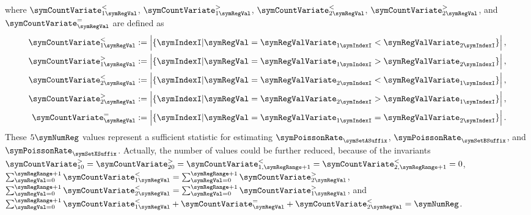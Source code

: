 \documentclass[a4paper]{scrartcl}
\begin{document}
where
$\symCountVariate^{<}_{1\symRegVal}$,
$\symCountVariate^{>}_{1\symRegVal}$,
$\symCountVariate^{<}_{2\symRegVal}$,
$\symCountVariate^{>}_{2\symRegVal}$,
and $\symCountVariate^{=}_{\symRegVal}$ are defined as
\begin{equation}
\label{equ:sufficient_joint_statistic}
\begin{aligned}
\symCountVariate^{<}_{1\symRegVal}&:=\left|\lbrace\symIndexI\vert\symRegVal=\symRegValVariate_{1\symIndexI}<
\symRegValVariate_{2\symIndexI}\rbrace\right|,
\\
\symCountVariate^{>}_{1\symRegVal}&:=\left|\lbrace\symIndexI\vert\symRegVal=\symRegValVariate_{1\symIndexI}>
\symRegValVariate_{2\symIndexI}\rbrace\right|,
\\
\symCountVariate^{<}_{2\symRegVal}&:=\left|\lbrace\symIndexI\vert\symRegVal=\symRegValVariate_{2\symIndexI}<
\symRegValVariate_{1\symIndexI}\rbrace\right|,
\\
\symCountVariate^{>}_{2\symRegVal}&:=\left|\lbrace\symIndexI\vert\symRegVal=\symRegValVariate_{2\symIndexI}>
\symRegValVariate_{1\symIndexI}\rbrace\right|,
\\
\symCountVariate^{=}_{\symRegVal}&:=\left|\lbrace\symIndexI\vert\symRegVal=\symRegValVariate_{1\symIndexI}=
\symRegValVariate_{2\symIndexI}\rbrace\right|.
\end{aligned}
\end{equation}
These $5\symNumReg$ values represent a sufficient statistic for estimating $\symPoissonRate_\symSetASuffix$, $\symPoissonRate_\symSetBSuffix$, and $\symPoissonRate_\symSetXSuffix$. Actually, the number of values could be further reduced, because of the invariants $\symCountVariate^{>}_{10}=\symCountVariate^{>}_{20}=
\symCountVariate^{<}_{1,\symRegRange+1}=\symCountVariate^{<}_{2,\symRegRange+1}=0$, $\sum_{\symRegVal=0}^{\symRegRange+1}{\symCountVariate^{<}_{1\symRegVal}} = \sum_{\symRegVal=0}^{\symRegRange+1}{\symCountVariate^{>}_{2\symRegVal}}$,
$\sum_{\symRegVal=0}^{\symRegRange+1}{\symCountVariate^{<}_{2\symRegVal}} = \sum_{\symRegVal=0}^{\symRegRange+1}{\symCountVariate^{>}_{1\symRegVal}}$,
and 
$\sum_{\symRegVal=0}^{\symRegRange+1}{\symCountVariate^{<}_{1\symRegVal}}
+
{\symCountVariate^{=}_{\symRegVal}}
+
{\symCountVariate^{<}_{2\symRegVal}}=\symNumReg$.
\end{document}
